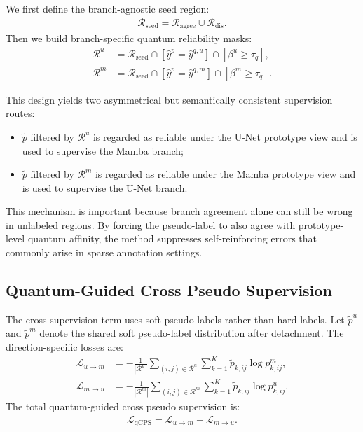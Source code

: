 We first define the branch-agnostic seed region:
\begin{align}
    \mathcal{R}_{\mathrm{seed}} = \mathcal{R}_{\mathrm{agree}} \cup \mathcal{R}_{\mathrm{dis}}.
\end{align}
Then we build branch-specific quantum reliability masks:
\begin{align}
    \mathcal{R}^u &= \mathcal{R}_{\mathrm{seed}}
    \cap
    \left[
    \hat{y}^{p} = \hat{y}^{q,u}
    \right]
    \cap
    \left[
    \beta^u \ge \tau_q
    \right], \\
    \mathcal{R}^m &= \mathcal{R}_{\mathrm{seed}}
    \cap
    \left[
    \hat{y}^{p} = \hat{y}^{q,m}
    \right]
    \cap
    \left[
    \beta^m \ge \tau_q
    \right].
\end{align}

This design yields two asymmetrical but semantically consistent supervision routes:
\begin{itemize}
\item $\tilde{p}$ filtered by $\mathcal{R}^u$ is regarded as reliable under the U-Net prototype view and is used to supervise the Mamba branch;
\item $\tilde{p}$ filtered by $\mathcal{R}^m$ is regarded as reliable under the Mamba prototype view and is used to supervise the U-Net branch.
\end{itemize}

This mechanism is important because branch agreement alone can still be wrong in unlabeled regions. By forcing the pseudo-label to also agree with prototype-level quantum affinity, the method suppresses self-reinforcing errors that commonly arise in sparse annotation settings.

\subsection{Quantum-Guided Cross Pseudo Supervision}
\label{subsec:qcps}
The cross-supervision term uses soft pseudo-labels rather than hard labels. Let $\tilde{p}^u$ and $\tilde{p}^m$ denote the shared soft pseudo-label distribution after detachment. The direction-specific losses are:
\begin{align}
    \mathcal{L}_{u \rightarrow m}
    &=
    -\frac{1}{|\mathcal{R}^u|}
    \sum_{(i,j)\in\mathcal{R}^u}
    \sum_{k=1}^{K}
    \tilde{p}_{k,ij} \log p^m_{k,ij}, \\
    \mathcal{L}_{m \rightarrow u}
    &=
    -\frac{1}{|\mathcal{R}^m|}
    \sum_{(i,j)\in\mathcal{R}^m}
    \sum_{k=1}^{K}
    \tilde{p}_{k,ij} \log p^u_{k,ij}.
\end{align}
The total quantum-guided cross pseudo supervision is:
\begin{align}
    \mathcal{L}_{\mathrm{qCPS}}
    =
    \mathcal{L}_{u \rightarrow m}
    +
    \mathcal{L}_{m \rightarrow u}.
\end{align}


